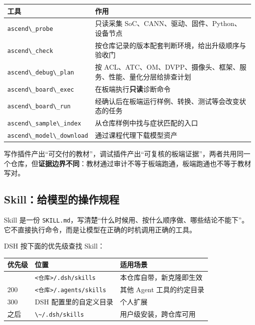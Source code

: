 \begin{longtable}[]{@{}
  >{\raggedright\arraybackslash}p{}
  >{\raggedright\arraybackslash}p{}@{}}
\toprule\noalign{}
\begin{minipage}[b]{\linewidth}\raggedright
工具
\end{minipage} & \begin{minipage}[b]{\linewidth}\raggedright
作用
\end{minipage} \\
\midrule\noalign{}
\endhead
\bottomrule\noalign{}
\endlastfoot
\passthrough{\lstinline!ascend\_probe!} & 只读采集
SoC、CANN、驱动、固件、Python、设备节点 \\
\passthrough{\lstinline!ascend\_check!} &
按仓库记录的版本配套判断环境，给出升级顺序与验收门 \\
\passthrough{\lstinline!ascend\_debug\_plan!} & 按
ACL、ATC、OM、DVPP、摄像头、框架、服务、性能、量化分层给排查计划 \\
\passthrough{\lstinline!ascend\_board\_exec!} &
在板端执行\textbf{只读}诊断命令 \\
\passthrough{\lstinline!ascend\_board\_run!} &
经确认后在板端运行样例、转换、测试等会改变状态的任务 \\
\passthrough{\lstinline!ascend\_sample\_index!} &
从仓库样例中找与症状匹配的入口 \\
\passthrough{\lstinline!ascend\_model\_download!} &
通过课程代理下载模型资产 \\
\end{longtable}

写作插件产出``可交付的教材''，调试插件产出``可复核的板端证据''，两者共用同一个仓库，但\textbf{证据边界不同}：教材通过审计不等于板端跑通，板端跑通也不等于教材写对。

\subsection{Skill：给模型的操作规程}\label{skillux7ed9ux6a21ux578bux7684ux64cdux4f5cux89c4ux7a0b}

Skill 是一份
\passthrough{\lstinline!SKILL.md!}，写清楚``什么时候用、按什么顺序做、哪些结论不能下''。它不直接执行命令，而是让模型在正确的时机调用正确的工具。

DSH 按下面的优先级查找 Skill：

\begin{longtable}[]{@{}lll@{}}
\toprule\noalign{}
优先级 & 位置 & 适用场景 \\
\midrule\noalign{}
\endhead
\bottomrule\noalign{}
\endlastfoot
100 & \passthrough{\lstinline!<仓库>/.dsh/skills!} &
本仓库自带，新克隆即生效 \\
200 & \passthrough{\lstinline!<仓库>/.agents/skills!} & 其他 Agent
工具的约定目录 \\
300 & DSH 配置里的自定义目录 & 个人扩展 \\
之后 & \passthrough{\lstinline!\~/.dsh/skills!} &
用户级安装，跨仓库可用 \\
\end{longtable}

